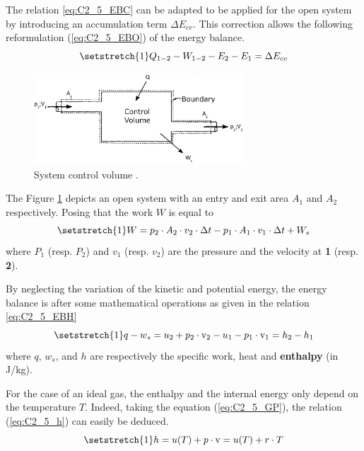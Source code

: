 The relation \ref{eq:C2_5_EBC} can be adapted to be applied for the open system by introducing an accumulation term $\Delta E_{cv}$. This correction allows the following reformulation (\ref{eq:C2_5_EBO}) of the energy balance.
\begin{equation}
\setstretch{1}
Q_{1-2} - W_{1-2} - E_{2} - E_{1} = \Delta E_{cv}\label{eq:C2_5_EBO}
\end{equation}

\begin{figure}[h]
\centering
\includegraphics[width=0.7\textwidth]{control_volume.png}
\caption{System control volume \cite{Dewallef2019}.}
\label{fig:C2_5_VC}
\end{figure}

The Figure \ref{fig:C2_5_VC} depicts an open system with an entry and exit area $A_1$ and $A_2$ respectively. Posing that the work $W$ is equal to 
\begin{equation}
\setstretch{1}
W = p_2\cdot A_2\cdot v_2\cdot \Delta t - p_1\cdot A_1\cdot v_1\cdot \Delta t + W_s
\end{equation}      
where $P_1$ (resp. $P_2$) and $v_1$ (resp. $v_2$) are the pressure and the velocity at \textbf{1} (resp. \textbf{2}).

By neglecting the variation of the kinetic and potential energy, the energy balance is after some mathematical operations as given in the relation \ref{eq:C2_5_EBH}
\begin{equation}
\setstretch{1}
q - w_s = u_2 +p_2\cdot \mathrm{v}_2 - u_1 - p_1\cdot \mathrm{v}_1 = h_2 - h_1\label{eq:C2_5_EBH}
\end{equation}
where $q$, $w_s$, and $h$ are respectively the specific work, heat and \textbf{enthalpy} (in J/kg).  

For the case of an ideal gas, the enthalpy and the internal energy only depend on the temperature $T$. Indeed, taking the equation (\ref{eq:C2_5_GP}), the relation (\ref{eq:C2_5_h}) can easily be deduced.
\begin{equation}
\setstretch{1}
h = u(T) + p\cdot \mathrm{v} = u(T) + r\cdot T \label{eq:C2_5_h}
\end{equation}

